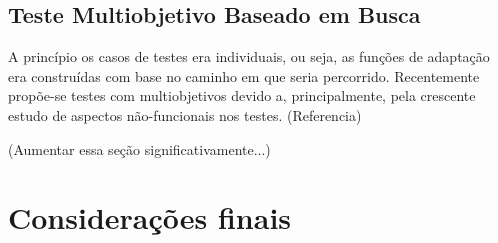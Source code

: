 \subsection{Teste Multiobjetivo Baseado em Busca}

A princípio os casos de testes era individuais, ou seja, as funções de
adaptação era construídas com base no caminho em que seria percorrido.
Recentemente propõe-se testes com multiobjetivos devido a, principalmente, pela
crescente estudo de aspectos não-funcionais nos testes. (Referencia)

(Aumentar essa seção significativamente...)






\section{Considerações finais \label{sec:considFinRefTeor}}



